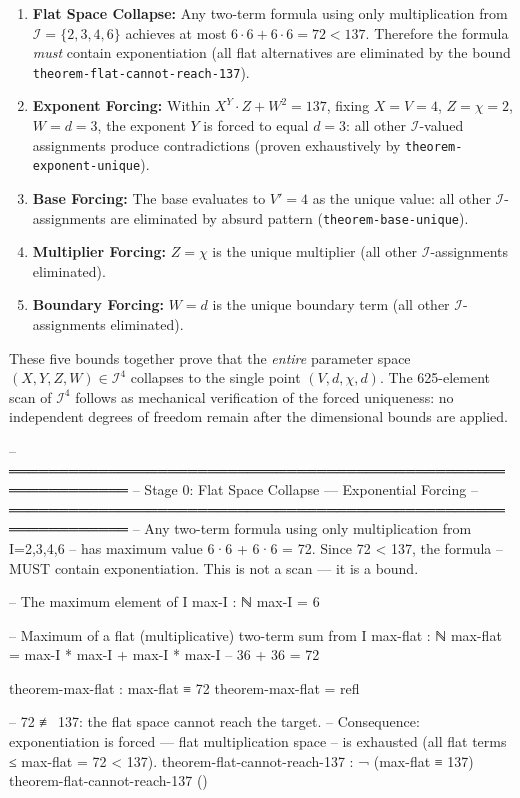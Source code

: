 \documentclass[11pt,a4paper]{article}
\begin{document}
\begin{enumerate}
\item \textbf{Flat Space Collapse:} Any two-term formula using only
  multiplication from $\mathcal{I} = \{2,3,4,6\}$ achieves at most
  $6 \cdot 6 + 6 \cdot 6 = 72 < 137$. Therefore the formula
  \emph{must} contain exponentiation (all flat alternatives are eliminated
  by the bound \texttt{theorem-flat-cannot-reach-137}).
\item \textbf{Exponent Forcing:} Within $X^Y \cdot Z + W^2 = 137$,
  fixing $X = V = 4$, $Z = \chi = 2$, $W = d = 3$, the exponent
  $Y$ is forced to equal $d = 3$: all other $\mathcal{I}$-valued
  assignments produce contradictions (proven exhaustively by
  \texttt{theorem-exponent-unique}).
\item \textbf{Base Forcing:} The base evaluates to $V' = 4$ as the
  unique value: all other $\mathcal{I}$-assignments are eliminated
  by absurd pattern (\texttt{theorem-base-unique}).
\item \textbf{Multiplier Forcing:} $Z = \chi$ is the unique
  multiplier (all other $\mathcal{I}$-assignments eliminated).
\item \textbf{Boundary Forcing:} $W = d$ is the unique boundary term
  (all other $\mathcal{I}$-assignments eliminated).
\end{enumerate}

\noindent These five bounds together prove that the \emph{entire}
parameter space $(X, Y, Z, W) \in \mathcal{I}^4$ collapses to the
single point $(V, d, \chi, d)$.  The 625-element scan of
$\mathcal{I}^4$ follows as mechanical verification of the forced
uniqueness: no independent degrees of freedom remain after the
dimensional bounds are applied.

\begin{code}
-- ══════════════════════════════════════════════════════════════
-- Stage 0: Flat Space Collapse — Exponential Forcing
-- ══════════════════════════════════════════════════════════════
-- Any two-term formula using only multiplication from I={2,3,4,6}
-- has maximum value 6·6 + 6·6 = 72.  Since 72 < 137, the formula
-- MUST contain exponentiation.  This is not a scan — it is a bound.

-- The maximum element of I
max-I : ℕ
max-I = 6

-- Maximum of a flat (multiplicative) two-term sum from I
max-flat : ℕ
max-flat = max-I * max-I + max-I * max-I  -- 36 + 36 = 72

theorem-max-flat : max-flat ≡ 72
theorem-max-flat = refl

-- 72 ≢ 137: the flat space cannot reach the target.
-- Consequence: exponentiation is forced — flat multiplication space
-- is exhausted (all flat terms ≤ max-flat = 72 < 137).
theorem-flat-cannot-reach-137 : ¬ (max-flat ≡ 137)
theorem-flat-cannot-reach-137 ()
\end{code}
\end{document}

